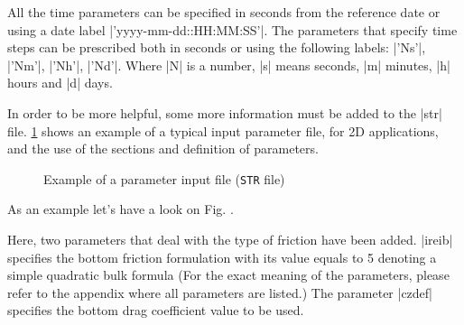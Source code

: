 All the time parameters can be specified in seconds from the reference
date or using a date label |'yyyy-mm-dd::HH:MM:SS'|. The parameters that specify
time steps can be prescribed both in seconds or using the following labels: 
|'Ns'|, |'Nm'|, |'Nh'|, |'Nd'|. 
Where |N| is a number, |s| means seconds, |m| minutes, |h| hours and |d| days.

In order to be more helpful, some more information must be added to the
|str| file. 
\Fig\ref{fig:example} shows an example of a typical input
parameter file, for 2D applications, and the use of the sections and definition of
parameters.

\begin{figure}[htbp]
\begin{alltt}

\end{alltt}
\caption{Example of a parameter input file ({\tt STR} file)}
\label{fig:example}
\end{figure}

As an example let's have a look on Fig. . 


Here, two parameters that deal with the type of friction have been added.
|ireib| specifies the bottom friction formulation with its value equals to 
5 denoting a simple quadratic bulk formula (For the exact meaning of the
parameters, please refer to the appendix where all parameters
are listed.) The parameter |czdef| specifies the bottom drag coefficient value to be used.



